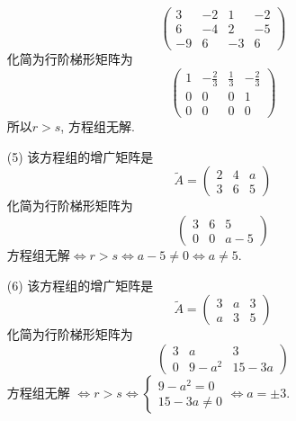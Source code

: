 \documentclass{article}
\begin{document}
\begin{itemize}
$$\begin{pmatrix}
        3 & -2 & 1 & -2 \\
        6 & -4 & 2 & -5 \\
        -9 & 6 & -3 & 6
        \end{pmatrix}        
        $$
    化简为行阶梯形矩阵为
    $$\begin{pmatrix}
        1 & -\frac{2}{3} & \frac{1}{3} & -\frac{2}{3} \\
        0 & 0 & 0 & 1 \\
        0 & 0 & 0 & 0
        \end{pmatrix}        
        $$
    所以$r > s$, 方程组无解.
    \item[(5)]
    该方程组的增广矩阵是
    $$\tilde{A} = \begin{pmatrix}
        2 & 4 & a \\
        3 & 6 & 5
        \end{pmatrix}        
    $$
    化简为行阶梯形矩阵为
    $$
    \begin{pmatrix}
        3 & 6 & 5 \\
        0 & 0 & a - 5
    \end{pmatrix}
    $$
    方程组无解$\Leftrightarrow  r > s \Leftrightarrow  a - 5 \neq 0 \Leftrightarrow a \neq 5$.
    \item[(6)]
    该方程组的增广矩阵是
    $$\tilde{A} = \begin{pmatrix}
        3 & a & 3 \\
        a & 3 & 5
        \end{pmatrix}        
    $$
    化简为行阶梯形矩阵为
    $$
    \begin{pmatrix}
        3 & a & 3 \\
        0 & 9 - a^2 & 15 - 3a
    \end{pmatrix}
    $$
    方程组无解 $\Leftrightarrow r > s \Leftrightarrow \begin{cases}
        9 - a^2 = 0 \\
        15 - 3a \neq 0
    \end{cases} \Leftrightarrow a = \pm 3$. 

\end{itemize}
\end{document}
